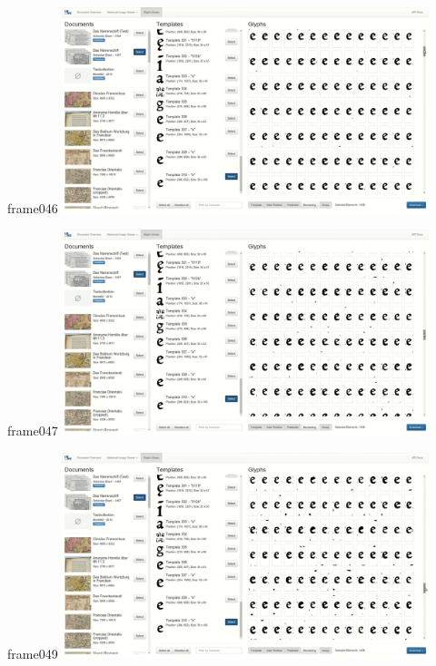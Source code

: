 \documentclass{beamer}
\begin{document}
\begin{frame}{frame046}
\includegraphics[width=0.8\textwidth]{output/exported-frames/frame046.png}
\note{}
\end{frame}

\begin{frame}{frame047}
\includegraphics[width=0.8\textwidth]{output/exported-frames/frame047.png}
\note{}
\end{frame}

\begin{frame}{frame049}
\includegraphics[width=0.8\textwidth]{output/exported-frames/frame049.png}
\note{}
\end{frame}
\end{document}
